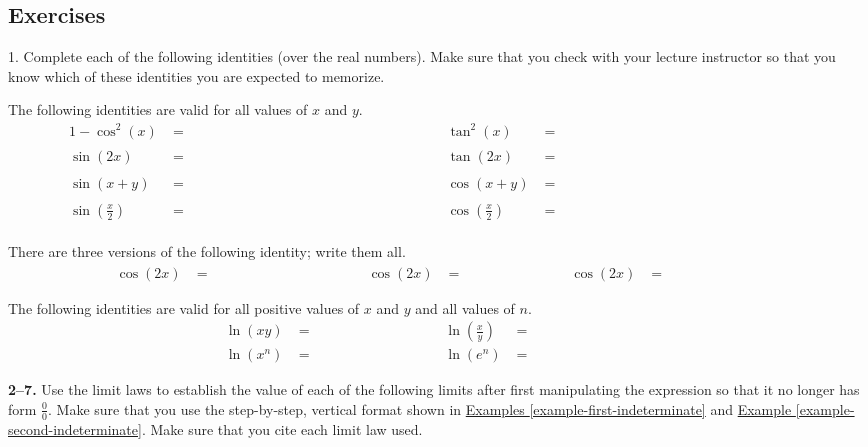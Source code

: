 \documentclass[10pt,oneside,]{book}
\theoremstyle{plain}
\theoremstyle{definition}
\numberwithin{equation}{section}
\newcommand{\fe}[2]{#1\mathopen{}\left(#2\right)\mathclose{}}
\begin{document}
\subsection[Exercises]{Exercises}\label{exercises-7}
\begin{exerciselist}
\item[1.]\hypertarget{exercise-identities-review}{\null}Complete each of the following identities (over the real numbers). Make sure that you check with your lecture instructor so that you know which of these identities you are expected to memorize.%
\par
The following identities are valid for all values of \(x\) and \(y\).\begin{align*}
1-\fe{\cos^2}{x}&=\phantom{\fe{\sin^2}{x}}&\fe{\tan^2}{x}&=\phantom{\fe{\sec^2}{x}-1}\\
\fe{\sin}{2x}&=\phantom{2\fe{\sin}{x}\fe{\cos}{x}}&\fe{\tan}{2x}&=\phantom{\frac{2\fe{\tan}{x}}{1-\fe{\tan^2}{x}}}\\
\fe{\sin}{x+y}&=\phantom{\fe{\sin}{x}\fe{\cos}{y}+\fe{\cos}{x}\fe{\sin}{y}}&\fe{\cos}{x+y}&=\phantom{\fe{\cos}{x}\fe{\cos}{y}-\fe{\sin}{x}\fe{\sin}{y}}\\
\fe{\sin}{\frac{x}{2}}&=\phantom{\sqrt{\frac{1-\fe{\cos}{x}}{2}}}&\fe{\cos}{\frac{x}{2}}&=\phantom{\sqrt{\frac{1+\fe{\cos}{x}}{2}}}
\end{align*}%
\par
There are three versions of the following identity; write them all.\begin{align*}
\fe{\cos}{2x}&=\phantom{\fe{\cos^2}{x}-\fe{\sin^2}{x}}&\fe{\cos}{2x}&=\phantom{2\fe{\cos^2}{x}-1}&\fe{\cos}{2x}&=\phantom{1-2\fe{\sin^2}{x}}
\end{align*}%
\par
The following identities are valid for all positive values of \(x\) and \(y\) and all values of \(n\).\begin{align*}
\fe{\ln}{xy}&=\phantom{\fe{\ln}{x}+\fe{\ln}{y}}&\fe{\ln}{\frac{x}{y}}&=\phantom{\fe{\ln}{x}-\fe{\ln}{y}}\\
\fe{\ln}{x^n}&=\phantom{n\fe{\ln}{x}}&\fe{\ln}{e^n}&=\phantom{n}
\end{align*}%
\par\smallskip
\end{exerciselist}
\textbf{2--7. }\hypertarget{exercisegroup-18}{\null}Use the limit laws to establish the value of each of the following limits after first manipulating the expression so that it
no longer has form \(\frac{0}{0}\). Make sure that you use the step-by-step, vertical format shown in \hyperref[example-first-indeterminate]{Examples \ref{example-first-indeterminate}} and \hyperref[example-second-indeterminate]{Example \ref{example-second-indeterminate}}. Make sure that you cite each limit law used.%
\end{document}
